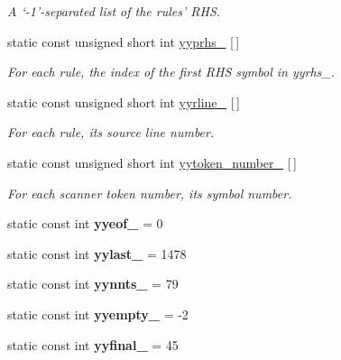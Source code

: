 \begin{DoxyCompactItemize}
\begin{DoxyCompactList}\small\item\em A `-\/1'-\/separated list of the rules' R\-H\-S. \end{DoxyCompactList}\item 
static const unsigned short int \hyperlink{classyy_1_1CParser_a4770c24bafb8279c34b75af15b77d94f}{yyprhs\-\_\-} \mbox{[}$\,$\mbox{]}
\begin{DoxyCompactList}\small\item\em For each rule, the index of the first R\-H\-S symbol in {\itshape yyrhs\-\_\-}. \end{DoxyCompactList}\item 
static const unsigned short int \hyperlink{classyy_1_1CParser_a78a3b99047240a491d46271231c42adb}{yyrline\-\_\-} \mbox{[}$\,$\mbox{]}
\begin{DoxyCompactList}\small\item\em For each rule, its source line number. \end{DoxyCompactList}\item 
static const unsigned short int \hyperlink{classyy_1_1CParser_af4038b8ba3f091e65529cb2a000f42ff}{yytoken\-\_\-number\-\_\-} \mbox{[}$\,$\mbox{]}
\begin{DoxyCompactList}\small\item\em For each scanner token number, its symbol number. \end{DoxyCompactList}\item 
\hypertarget{classyy_1_1CParser_ad1f2993f23c6fe89f1f6b5b821b3299b}{static const int {\bfseries yyeof\-\_\-} = 0}\label{classyy_1_1CParser_ad1f2993f23c6fe89f1f6b5b821b3299b}

\item 
\hypertarget{classyy_1_1CParser_a5489dd7aa15fc15479e349c389b86d0d}{static const int {\bfseries yylast\-\_\-} = 1478}\label{classyy_1_1CParser_a5489dd7aa15fc15479e349c389b86d0d}

\item 
\hypertarget{classyy_1_1CParser_af62ff3c79818e591ed15d7adbe308cd6}{static const int {\bfseries yynnts\-\_\-} = 79}\label{classyy_1_1CParser_af62ff3c79818e591ed15d7adbe308cd6}

\item 
\hypertarget{classyy_1_1CParser_afbb6dc6130620008ecdfd715daa296cc}{static const int {\bfseries yyempty\-\_\-} = -\/2}\label{classyy_1_1CParser_afbb6dc6130620008ecdfd715daa296cc}

\item 
\hypertarget{classyy_1_1CParser_af49acb26986739516c14b8cd098d1429}{static const int {\bfseries yyfinal\-\_\-} = 45}\label{classyy_1_1CParser_af49acb26986739516c14b8cd098d1429}


\end{DoxyCompactItemize}
